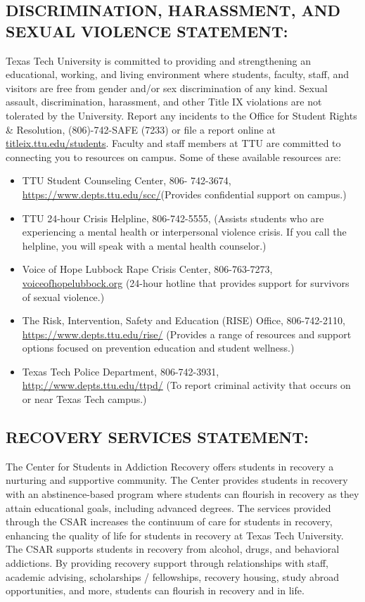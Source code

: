 \documentclass[12pt]{article}
\begin{document}
\subsection*{DISCRIMINATION, HARASSMENT, AND SEXUAL VIOLENCE STATEMENT:}

Texas Tech University is committed to providing and strengthening an educational, working, and living environment where students, faculty, staff, and visitors are free from gender and/or sex discrimination of any kind. Sexual assault, discrimination, harassment, and other Title IX violations are not tolerated by the University. Report any incidents to the Office for Student Rights \& Resolution, (806)-742-SAFE (7233) or file a report online at \url{titleix.ttu.edu/students}. Faculty and staff members at TTU are committed to connecting you to resources on campus. Some of these available resources are: 
\begin{itemize}
\item TTU Student Counseling Center, 806- 742-3674, \url{https://www.depts.ttu.edu/scc/}(Provides confidential support on campus.) 
\item TTU 24-hour Crisis Helpline, 806-742-5555, (Assists students who are experiencing a mental health or interpersonal violence crisis. If you call the helpline, you will speak with a mental health counselor.) 
\item Voice of Hope Lubbock Rape Crisis Center, 806-763-7273, \url{voiceofhopelubbock.org} (24-hour hotline that provides support for survivors of sexual violence.) 
\item The Risk, Intervention, Safety and Education (RISE) Office, 806-742-2110, \url{https://www.depts.ttu.edu/rise/} (Provides a range of resources and support options focused on prevention education and student wellness.) 
\item Texas Tech Police Department, 806-742-3931, \url{http://www.depts.ttu.edu/ttpd/} (To report criminal activity that occurs on or near Texas Tech campus.)
\end{itemize}
 
\subsection*{RECOVERY SERVICES STATEMENT:}

The Center for Students in Addiction Recovery offers students in recovery a nurturing and supportive community. The Center provides students in recovery with an abstinence-based program where students can flourish in recovery as they attain educational goals, including advanced degrees. The services provided through the CSAR increases the continuum of care for students in recovery, enhancing the quality of life for students in recovery at Texas Tech University. The CSAR supports students in recovery from alcohol, drugs, and behavioral addictions. By providing recovery support through relationships with staff, academic advising, scholarships / fellowships, recovery housing, study abroad opportunities, and more, students can flourish in recovery and in life.
\end{document}
